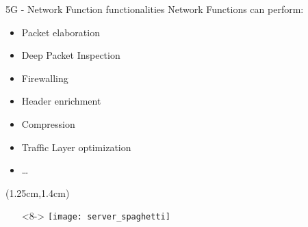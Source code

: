 \begin{frame}{5G - Network Function functionalities}
  Network Functions can perform:
  \begin{itemize}
  \item<1-> Packet elaboration
  \item<2-> Deep Packet Inspection
  \item<3-> Firewalling
  \item<4-> Header enrichment
  \item<5-> Compression
  \item<6-> Traffic Layer optimization
  \item<7-> \dots
  \end{itemize}

  \begin{textblock*}{5cm}(1.25cm,1.4cm)
    \begin{itemize}
      \item[]<8-> \texttt{[image: server\_spaghetti]}
    \end{itemize}
  \end{textblock*}
\end{frame}

